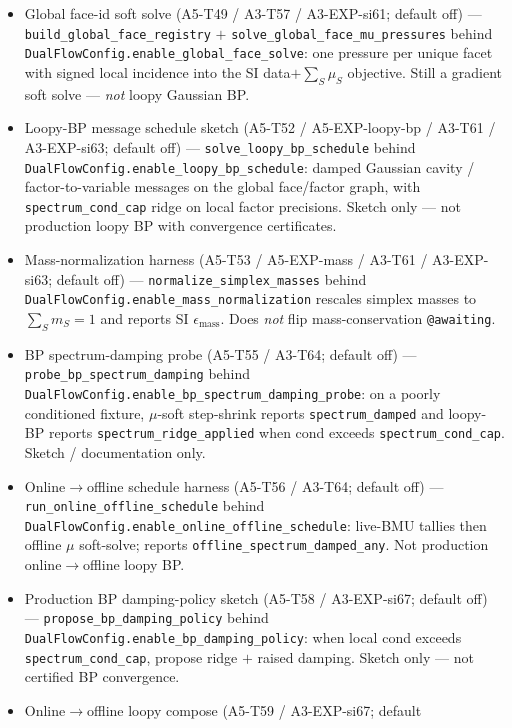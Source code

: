 \documentclass[11pt]{article}
\begin{document}
\begin{itemize}[leftmargin=1.5em]
  global face variable / loopy BP --- only soft glue on private copies.
  \item Global face-id soft solve (A5-T49 / A3-T57 / A3-EXP-si61; default off)
  --- \texttt{build\_global\_face\_registry} $+$
  \texttt{solve\_global\_face\_mu\_pressures} behind
  \texttt{DualFlowConfig.enable\_global\_face\_solve}: one pressure per
  unique facet with signed local incidence into the SI data$+\sum_S\mu_S$
  objective. Still a gradient soft solve --- \emph{not} loopy Gaussian BP.
  \item Loopy-BP message schedule sketch (A5-T52 / A5-EXP-loopy-bp /
  A3-T61 / A3-EXP-si63; default off) ---
  \texttt{solve\_loopy\_bp\_schedule} behind
  \texttt{DualFlowConfig.enable\_loopy\_bp\_schedule}: damped Gaussian
  cavity / factor-to-variable messages on the global face/factor graph,
  with \texttt{spectrum\_cond\_cap} ridge on local factor precisions.
  Sketch only --- not production loopy BP with convergence certificates.
  \item Mass-normalization harness (A5-T53 / A5-EXP-mass / A3-T61 /
  A3-EXP-si63; default off) --- \texttt{normalize\_simplex\_masses} behind
  \texttt{DualFlowConfig.enable\_mass\_normalization} rescales simplex
  masses to $\sum_S m_S{=}1$ and reports SI $\epsilon_{\mathrm{mass}}$.
  Does \emph{not} flip mass-conservation \texttt{@awaiting}.
  \item BP spectrum-damping probe (A5-T55 / A3-T64; default off) ---
  \texttt{probe\_bp\_spectrum\_damping} behind
  \texttt{DualFlowConfig.enable\_bp\_spectrum\_damping\_probe}: on a poorly
  conditioned fixture, $\mu$-soft step-shrink reports
  \texttt{spectrum\_damped} and loopy-BP reports
  \texttt{spectrum\_ridge\_applied} when cond exceeds
  \texttt{spectrum\_cond\_cap}. Sketch / documentation only.
  \item Online$\to$offline schedule harness (A5-T56 / A3-T64; default off)
  --- \texttt{run\_online\_offline\_schedule} behind
  \texttt{DualFlowConfig.enable\_online\_offline\_schedule}: live-BMU
  tallies then offline $\mu$ soft-solve; reports
  \texttt{offline\_spectrum\_damped\_any}. Not production online$\to$offline
  loopy BP.
  \item Production BP damping-policy sketch (A5-T58 / A3-EXP-si67;
  default off) --- \texttt{propose\_bp\_damping\_policy} behind
  \texttt{DualFlowConfig.enable\_bp\_damping\_policy}: when local cond
  exceeds \texttt{spectrum\_cond\_cap}, propose ridge $+$ raised damping.
  Sketch only --- not certified BP convergence.
  \item Online$\to$offline loopy compose (A5-T59 / A3-EXP-si67; default

\end{itemize}
\end{document}
